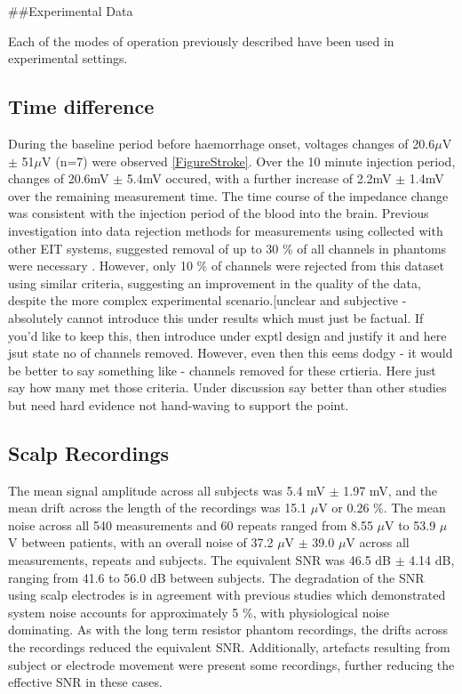 ##Experimental Data

Each of the modes of operation previously described have been used in experimental settings. 

\subsection{Time difference}
During the baseline period before haemorrhage onset, voltages changes of 20.6\(\mu\)V \(\pm\) 51\(\mu\)V (n=7) were observed \ref{FigureStroke}. Over the 10 minute injection period, changes of 20.6mV \(\pm\) 5.4mV occured, with a further increase of 2.2mV \(\pm\) 1.4mV over the remaining measurement time. The time course of the impedance change was consistent with the injection period of the blood into the brain. Previous investigation into data rejection methods for measurements using collected with other EIT systems, suggested removal of up to 30 \% of all channels in phantoms were necessary \cite{packham2012comparison}. However, only 10 \% of channels were rejected from this dataset using similar criteria, suggesting an improvement in the quality of the data, despite the more complex experimental scenario.[unclear and subjective - absolutely cannot introduce this under results which must just be factual. If you'd like to keep this, then introduce under exptl design and justify it and here jsut state no of channels removed. However, even then this eems dodgy - it would be better to say something like - channels removed for these crtieria. Here just say how many met those criteria. Under discussion say better than other studies but need hard evidence not hand-waving to support the point.

\subsection{Scalp Recordings}
The mean signal amplitude across all subjects was 5.4 mV $\pm$ 1.97 mV, and the mean drift across the length of the recordings was 15.1 $\mu$V or 0.26 \%. The mean noise across all 540 measurements and 60 repeats ranged from 8.55 $\mu$V to 53.9 $\mu$V between patients, with an overall noise of 37.2  $\mu$V $\pm$ 39.0 $\mu$V across all measurements, repeats and subjects. The equivalent SNR was 46.5 dB $\pm$ 4.14 dB, ranging from 41.6 to 56.0 dB between subjects. The degradation of the SNR using scalp electrodes is in agreement with previous studies \cite{fabrizi2007analysis} which demonstrated system noise accounts for approximately 5 \%, with physiological noise dominating. As with the long term resistor phantom recordings, the drifts across the recordings reduced the equivalent SNR. Additionally, artefacts resulting from subject or electrode movement were present some recordings, further reducing the effective SNR in these cases.  

